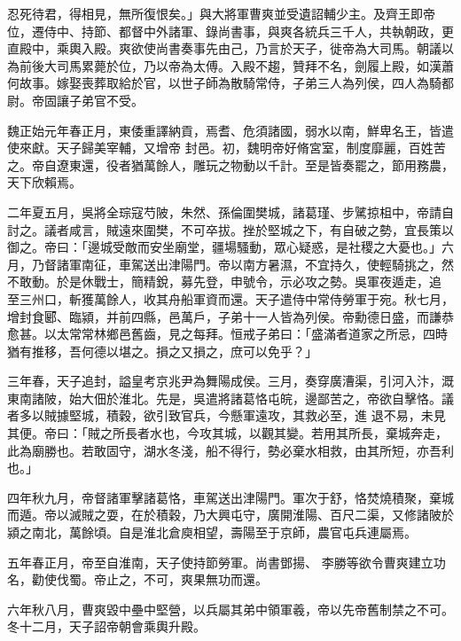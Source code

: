 \begin{pinyinscope}
 忍死待君，得相見，無所復恨矣。」與大將軍曹爽並受遺詔輔少主。及齊王即帝位，遷侍中、持節、都督中外諸軍、錄尚書事，與爽各統兵三千人，共執朝政，更直殿中，乘輿入殿。爽欲使尚書奏事先由己，乃言於天子，徙帝為大司馬。朝議以為前後大司馬累薨於位，乃以帝為太傅。入殿不趨，贊拜不名，劍履上殿，如漢蕭何故事。嫁娶喪葬取給於官，以世子師為散騎常侍，子弟三人為列侯，四人為騎都尉。帝固讓子弟官不受。



 魏正始元年春正月，東倭重譯納貢，焉耆、危須諸國，弱水以南，鮮卑名王，皆遣使來獻。天子歸美宰輔，又增帝
 封邑。初，魏明帝好脩宮室，制度靡麗，百姓苦之。帝自遼東還，役者猶萬餘人，雕玩之物動以千計。至是皆奏罷之，節用務農，天下欣賴焉。



 二年夏五月，吳將全琮寇芍陂，朱然、孫倫圍樊城，諸葛瑾、步騭掠柤中，帝請自討之。議者咸言，賊遠來圍樊，不可卒拔。挫於堅城之下，有自破之勢，宜長策以御之。帝曰：「邊城受敵而安坐廟堂，疆場騷動，眾心疑惑，是社稷之大憂也。」六月，乃督諸軍南征，車駕送出津陽門。帝以南方暑濕，不宜持久，使輕騎挑之，然不敢動。於是休戰士，簡精銳，募先登，申號令，示必攻之勢。吳軍夜遁走，追
 至三州口，斬獲萬餘人，收其舟船軍資而還。天子遣侍中常侍勞軍于宛。秋七月，增封食郾、臨潁，并前四縣，邑萬戶，子弟十一人皆為列侯。帝勳德日盛，而謙恭愈甚。以太常常林鄉邑舊齒，見之每拜。恒戒子弟曰：「盛滿者道家之所忌，四時猶有推移，吾何德以堪之。損之又損之，庶可以免乎？」



 三年春，天子追封，謚皇考京兆尹為舞陽成侯。三月，奏穿廣漕渠，引河入汴，溉東南諸陂，始大佃於淮北。先是，吳遣將諸葛恪屯皖，邊鄙苦之，帝欲自擊恪。議者多以賊據堅城，積穀，欲引致官兵，今懸軍遠攻，其救必至，進
 退不易，未見其便。帝曰：「賊之所長者水也，今攻其城，以觀其變。若用其所長，棄城奔走，此為廟勝也。若敢固守，湖水冬淺，船不得行，勢必棄水相救，由其所短，亦吾利也。」



 四年秋九月，帝督諸軍擊諸葛恪，車駕送出津陽門。軍次于舒，恪焚燒積聚，棄城而遁。帝以滅賊之耍，在於積穀，乃大興屯守，廣開淮陽、百尺二渠，又修諸陂於潁之南北，萬餘頃。自是淮北倉庾相望，壽陽至于京師，農官屯兵連屬焉。



 五年春正月，帝至自淮南，天子使持節勞軍。尚書鄧揚、
 李勝等欲令曹爽建立功名，勸使伐蜀。帝止之，不可，爽果無功而還。



 六年秋八月，曹爽毀中壘中堅營，以兵屬其弟中領軍羲，帝以先帝舊制禁之不可。冬十二月，天子詔帝朝會乘輿升殿。




\end{pinyinscope}
